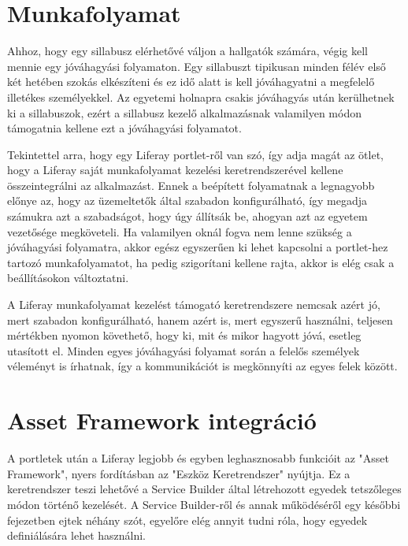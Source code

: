 \documentclass[hidelinks, 12pt, a4paper]{report}
\begin{document}
\section{Munkafolyamat}

Ahhoz, hogy egy sillabusz elérhetővé váljon a hallgatók számára, végig kell mennie egy jóváhagyási folyamaton. Egy sillabuszt tipikusan minden félév első két hetében szokás elkészíteni és ez idő alatt is kell jóváhagyatni a megfelelő illetékes személyekkel. Az egyetemi holnapra csakis jóváhagyás után kerülhetnek ki a sillabuszok, ezért a sillabusz kezelő alkalmazásnak valamilyen módon támogatnia kellene ezt a jóváhagyási folyamatot.

Tekintettel arra, hogy egy Liferay portlet-ről van szó, így adja magát az ötlet, hogy a Liferay saját munkafolyamat kezelési keretrendszerével kellene összeintegrálni az alkalmazást. Ennek a beépített folyamatnak a legnagyobb előnye az, hogy az üzemeltetők által szabadon konfigurálható, így megadja számukra azt a szabadságot, hogy úgy állítsák be, ahogyan azt az egyetem vezetősége megköveteli. Ha valamilyen oknál fogva nem lenne szükség a jóváhagyási folyamatra, akkor egész egyszerűen ki lehet kapcsolni a portlet-hez tartozó munkafolyamatot, ha pedig szigorítani kellene rajta, akkor is elég csak a beállításokon változtatni.

A Liferay munkafolyamat kezelést támogató keretrendszere nemcsak azért jó, mert szabadon konfigurálható, hanem azért is, mert egyszerű használni, teljesen mértékben nyomon követhető, hogy ki, mit és mikor hagyott jóvá, esetleg utasított el. Minden egyes jóváhagyási folyamat során a felelős személyek véleményt is írhatnak, így a kommunikációt is megkönnyíti az egyes felek között.

\section{Asset Framework integráció}

A portletek után a Liferay legjobb és egyben leghasznosabb funkcióit az "Asset Framework", nyers fordításban az "Eszköz Keretrendszer" nyújtja. Ez a keretrendszer teszi lehetővé a Service Builder által létrehozott egyedek tetszőleges módon történő kezelését. A Service Builder-ről és annak működéséről egy későbbi fejezetben ejtek néhány szót, egyelőre elég annyit tudni róla, hogy egyedek definiálására lehet használni.
\end{document}

